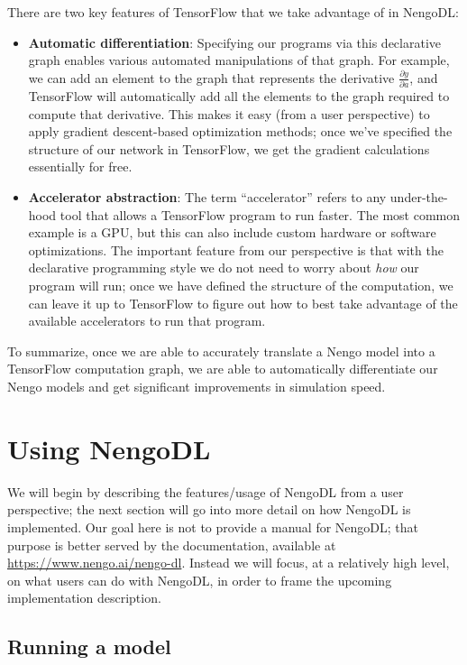 \documentclass{article}
\begin{document}
There are two key features of TensorFlow that we take advantage of in NengoDL:

\begin{itemize}
\item {\bf Automatic differentiation}: Specifying our programs via this declarative graph enables various automated manipulations of that graph.  For example, we can add an element to the graph that represents the derivative $\frac{\partial y}{\partial a}$, and TensorFlow will automatically add all the elements to the graph required to compute that derivative.  This makes it easy (from a user perspective) to apply gradient descent-based optimization methods; once we've specified the structure of our network in TensorFlow, we get the gradient calculations essentially for free.
\item {\bf Accelerator abstraction}: The term ``accelerator'' refers to any under-the-hood tool that allows a TensorFlow program to run faster.  The most common example is a GPU, but this can also include custom hardware or software optimizations.  The important feature from our perspective is that with the declarative programming style we do not need to worry about \emph{how} our program will run; once we have defined the structure of the computation, we can leave it up to TensorFlow to figure out how to best take advantage of the available accelerators to run that program.
\end{itemize}

To summarize, once we are able to accurately translate a Nengo model into a TensorFlow computation graph, we are able to automatically differentiate our Nengo models and get significant improvements in simulation speed.

\section{Using NengoDL}
\label{sec:usage}

We will begin by describing the features/usage of NengoDL from a user perspective; the next section will go into more detail on how NengoDL is implemented.  Our goal here is not to provide a manual for NengoDL; that purpose is better served by the documentation, available at \url{https://www.nengo.ai/nengo-dl}.  Instead we will focus, at a relatively high level, on what users can do with NengoDL, in order to frame the upcoming implementation description.

\subsection{Running a model}
\label{sec:running}
\end{document}
